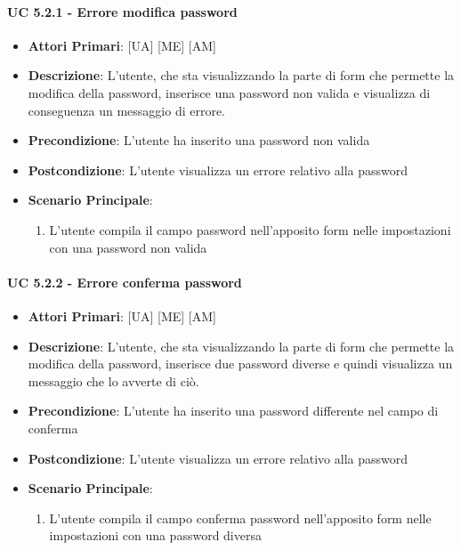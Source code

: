 			\paragraph{UC 5.2.1 - Errore modifica password}
			\begin{itemize}
				\item \textbf{Attori Primari}: [UA] [ME] [AM]
				\item \textbf{Descrizione}: L'utente, che sta visualizzando la parte di form che permette la modifica della password, inserisce una password non valida e visualizza di conseguenza un messaggio di errore.
				\item \textbf{Precondizione}: L'utente ha inserito una password non valida
				\item \textbf{Postcondizione}: L'utente visualizza un errore relativo alla password
				\item \textbf{Scenario Principale}:
				\begin{enumerate}
					\item{L'utente compila il campo password nell'apposito form nelle impostazioni con una password non valida}
				\end{enumerate}	
			\end{itemize}


			\paragraph{UC 5.2.2 - Errore conferma password}
			\begin{itemize}
				\item \textbf{Attori Primari}: [UA] [ME] [AM]
				\item \textbf{Descrizione}: L'utente, che sta visualizzando la parte di form che permette la modifica della password, inserisce due password diverse e quindi visualizza un messaggio che lo avverte di ciò.
				\item \textbf{Precondizione}: L'utente ha inserito una password differente nel campo di conferma
				\item \textbf{Postcondizione}: L'utente visualizza un errore relativo alla password
				\item \textbf{Scenario Principale}:
				\begin{enumerate}
					\item{L'utente compila il campo conferma password nell'apposito form nelle impostazioni con una password diversa}
				\end{enumerate}	
			\end{itemize}

